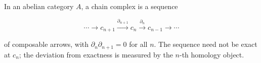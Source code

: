 In an abelian category $A$, a chain complex is a sequence

$$\cdots \rightarrow c_{n+1} \xrightarrow{\partial_{n+1}} c_n \xrightarrow{\partial_n} c_{n-1} \rightarrow \cdots$$

of composable arrows, with $\partial_n \partial_{n+1} = 0$ for all $n$. The sequence need not be exact at $c_n$; the deviation from exactness is measured by the $n$-th homology object.
